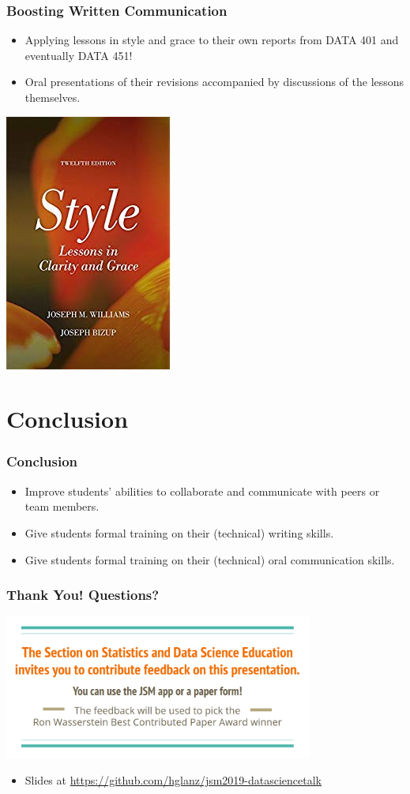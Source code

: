 \documentclass[xcolor={dvipsnames}]{beamer}
\newcommand{\ft}{\frametitle}
\newcommand{\bi}{\begin{itemize}}
\newcommand{\ei}{\end{itemize}}
\begin{document}
\begin{frame}
\ft{Boosting Written Communication}
\bi
	\item Applying lessons in style and grace to their own reports from DATA 401 and eventually DATA 451!
	\pause
	\item Oral presentations of their revisions accompanied by discussions of the lessons themselves.
\ei
\begin{center}
	\includegraphics[width = .25\textwidth]{styleandgrace_book.jpg}
\end{center}
\end{frame}

\section{Conclusion}

\begin{frame}
\ft{Conclusion}
\bi
	\item Improve students' abilities to collaborate and communicate with peers or team members.
	\pause
	\item Give students formal training on their (technical) writing skills.
	\pause
	\item Give students formal training on their (technical) oral communication skills.
\ei
\end{frame}

\begin{frame}
\frametitle{Thank You! Questions?}
\begin{center}
	\includegraphics[width = 4in]{lastslide_survey.png}
\end{center}
\bi
	\item Slides at \href{https://github.com/hglanz/jsm2019-datasciencetalk}{https://github.com/hglanz/jsm2019-datasciencetalk}
\ei
\end{frame}
\end{document}

